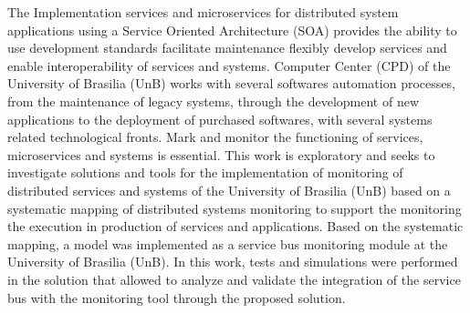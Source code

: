 The Implementation services and microservices for distributed system applications using a Service Oriented Architecture (SOA) provides the ability to use development standards facilitate maintenance flexibly develop services and enable interoperability of services and systems. Computer Center (CPD) of the University of Brasilia (UnB) works with several softwares automation processes, from the maintenance of legacy systems, through the development of new applications to the deployment of purchased softwares, with several systems related technological fronts. Mark and monitor the functioning of services, microservices and systems is essential. This work is exploratory and seeks to investigate solutions and tools for the implementation of monitoring of distributed services and systems of the University of Brasilia (UnB) based on a systematic mapping of distributed systems monitoring to support the monitoring the execution in production of services and applications. Based on the systematic mapping, a model was implemented as a service bus monitoring module at the University of Brasilia (UnB). In this work, tests and simulations were performed in the solution that allowed to analyze and validate the integration of the service bus with the monitoring tool through the proposed solution.